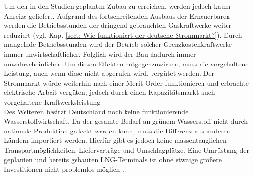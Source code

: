 		Um den in den Studien geplanten Zubau zu erreichen, werden jedoch kaum Anreize geliefert.
		Aufgrund des fortschreitenden Ausbaus der Erneuerbaren werden die Betriebsstunden der dringend gebrauchten Gaskraftwerke weiter reduziert (vgl. Kap. \ref{sect: Wie funktioniert der deutsche Strommarkt?}).
		Durch mangelnde Betriebsstunden wird der Betrieb solcher Grenzkostenkraftwerke immer unwirtschaftlicher.
		Folglich wird der Bau dadurch immer unwahrscheinlicher.
		Um diesen Effekten entgegenzuwirken, muss die vorgehaltene Leistung, auch wenn diese nicht abgerufen wird, vergütet werden.
		Der Strommarkt würde weiterhin nach einer Merit-Order funktionieren und erbrachte elektrische Arbeit vergüten, jedoch durch einen Kapazitätsmarkt auch vorgehaltene Kraftwerksleistung. \\
		
		Des Weiteren besitzt Deutschland noch keine funktionierende Wasserstoffwirtschaft. 
		Da der gesamte Bedarf an grünem Wasserstoff nicht durch nationale Produktion gedeckt werden kann, muss die Differenz aus anderen Ländern importiert werden.
		Hierfür gibt es jedoch keine massentauglichen Transportmöglichkeiten, Lieferverträge und Umschlagplätze.
		Eine Umrüstung der geplanten und bereits gebauten LNG-Terminals ist ohne etwaige größere Investitionen nicht problemlos möglich \cite{Frauenhofer_LNG}. 
		\clearpage
		
		
			
		
		